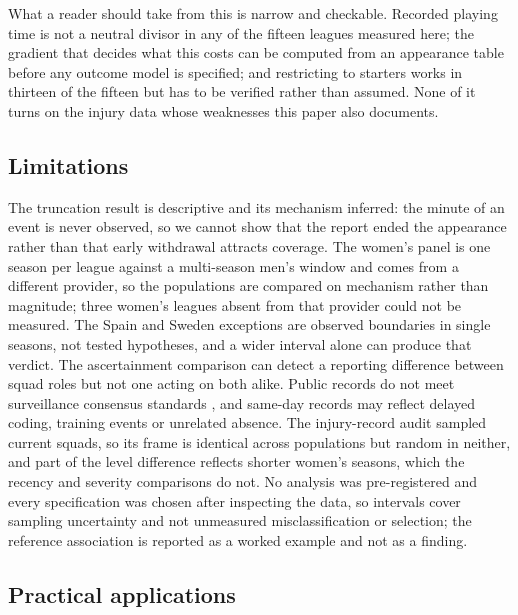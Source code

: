 \documentclass[11pt]{article}
\begin{document}
What a reader should take from this is narrow and checkable. Recorded playing time is not a neutral divisor in any of the fifteen leagues measured here; the gradient that decides what this costs can be computed from an appearance table before any outcome model is specified; and restricting to starters works in thirteen of the fifteen but has to be verified rather than assumed. None of it turns on the injury data whose weaknesses this paper also documents.

\subsection{Limitations}

The truncation result is descriptive and its mechanism inferred: the minute of an event is never observed, so we cannot show that the report ended the appearance rather than that early withdrawal attracts coverage. The women's panel is one season per league against a multi-season men's window and comes from a different provider, so the populations are compared on mechanism rather than magnitude; three women's leagues absent from that provider could not be measured. The Spain and Sweden exceptions are observed boundaries in single seasons, not tested hypotheses, and a wider interval alone can produce that verdict. The ascertainment comparison can detect a reporting difference between squad roles but not one acting on both alike. Public records do not meet surveillance consensus standards \cite{bahr2020ioc,walden2023_football_consensus}, and same-day records may reflect delayed coding, training events or unrelated absence. The injury-record audit sampled current squads, so its frame is identical across populations but random in neither, and part of the level difference reflects shorter women's seasons, which the recency and severity comparisons do not. No analysis was pre-registered and every specification was chosen after inspecting the data, so intervals cover sampling uncertainty and not unmeasured misclassification or selection; the reference association is reported as a worked example and not as a finding.

\subsection{Practical applications}
\end{document}
